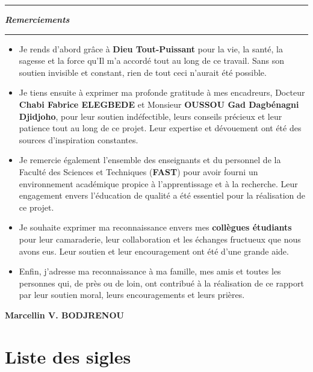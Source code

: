 \documentclass[a4paper,12pt]{report}
\theoremstyle{definition}
\begin{document}
	\begin{center}
		\colorbox{gray!0}{\rule{\textwidth}{0.005cm}}
		{\Huge\textbf{\textit{Remerciements}}}
		\vspace{1cm}
		\colorbox{gray!0}{\rule{\textwidth}{0.005cm}}
	\end{center}
	\begin{itemize}[label=$\spadesuit$]
		\item Je rends d’abord grâce à \textbf{Dieu Tout-Puissant} pour la vie, la santé, la sagesse et la force qu’Il m'a accordé tout au long de ce travail. Sans son soutien invisible et constant, rien de tout ceci n’aurait été possible.
		\item Je tiens ensuite à exprimer ma profonde gratitude à mes encadreurs, Docteur \textbf{Chabi Fabrice ELEGBEDE} et Monsieur \textbf{OUSSOU Gad Dagbénagni Djidjoho}, pour leur soutien indéfectible, leurs conseils précieux et leur patience tout au long de ce projet. Leur expertise et dévouement ont été des sources d’inspiration constantes.
		\item Je remercie également l’ensemble des enseignants et du personnel de la Faculté des Sciences et Techniques (\textbf{FAST}) pour avoir fourni un environnement académique propice à l’apprentissage et à la recherche. Leur engagement envers l’éducation de qualité a été essentiel pour la réalisation de ce projet.
		\item Je souhaite exprimer ma reconnaissance envers mes \textbf{collègues étudiants} pour leur camaraderie, leur collaboration et les échanges fructueux que nous avons eus. Leur soutien et leur encouragement ont été d’une grande aide.
		\item Enfin, j'adresse ma reconnaissance à ma famille, mes amis et toutes les personnes qui, de près ou de loin, ont contribué à la réalisation de ce rapport par leur soutien moral, leurs encouragements et leurs prières.
	\end{itemize}
	\vspace{0.5cm}
	\phantom{fjjffcmffffffffffffffffffffffjfffffffffffffffffffffffffjfjfjffjjjjjjjjjjjjjjhhhh} \textbf{Marcellin V. BODJRENOU}
	
	
	\tableofcontents
	
	\newpage
	
	\listoftables
	
	\newpage
	
	\listoffigures
	
	\newpage
	
	\chapter*{Liste des sigles}
	
\end{document}
